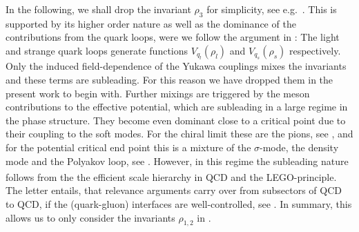 \documentclass[reprint,twocolumn,superscriptaddress,preprintnumbers,amsmath,amssymb,aps,prd,floatfix]{revtex4-2}
\newcommand{\LEGO}{LEGO\textsuperscript{\textregistered}}
\begin{document}
% 
In the following, we shall drop the invariant $\rho_3$ for simplicity, see e.g.~\cite{Mitter:2013fxa, Rennecke:2016tkm}. This is supported by its higher order nature as well as the dominance of the contributions from the quark loops, were we follow the argument in \cite{Ihssen:2024miv}: The light and strange quark loops generate functions $V_{q_l}(\rho_l)$ and $V_{q_s}(\rho_s)$ respectively. Only the induced field-dependence of the Yukawa couplings mixes the invariants and these terms are subleading. For this reason we have dropped them in the present work to begin with. Further mixings are triggered by the meson contributions to the effective potential, which are subleading in a large regime in the phase structure. They become even dominant close to a critical point due to their coupling to the soft modes. For the chiral limit these are the pions, see \cite{Braun:2023qak}, and for the potential critical end point this is a mixture of the $\sigma$-mode, the density mode and the Polyakov loop, see \cite{Haensch:2023sig}. However, in this regime the subleading nature follows from the the efficient scale hierarchy in QCD and the \LEGO-principle. The letter entails, that relevance arguments carry over from subsectors of QCD to QCD, if the (quark-gluon) interfaces are well-controlled, see \cite{Ihssen:2024miv, Fischer:2026uni}. In summary, this allows us to only consider the invariants $\rho_{1,2}$ in . 
\end{document}

